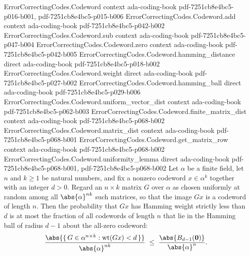 \begin{theorem}
\label{ErrorCorrectingCodes.Codeword.prob_leq_ball_size}
\leanok
{}
\proofstep
  {ErrorCorrectingCodes.Codeword}
  {context}
  {ada-coding-book}
  {pdf-7251cb8e4bc5-p016-b001,
    pdf-7251cb8e4bc5-p015-b006}
\proofstep
  {ErrorCorrectingCodes.Codeword.add}
  {context}
  {ada-coding-book}
  {pdf-7251cb8e4bc5-p042-b002}
\proofstep
  {ErrorCorrectingCodes.Codeword.sub}
  {context}
  {ada-coding-book}
  {pdf-7251cb8e4bc5-p047-b004}
\proofstep
  {ErrorCorrectingCodes.Codeword.zero}
  {context}
  {ada-coding-book}
  {pdf-7251cb8e4bc5-p042-b005}
\proofstep
  {ErrorCorrectingCodes.Codeword.hamming_distance}
  {direct}
  {ada-coding-book}
  {pdf-7251cb8e4bc5-p018-b002}
\proofstep
  {ErrorCorrectingCodes.Codeword.weight}
  {direct}
  {ada-coding-book}
  {pdf-7251cb8e4bc5-p027-b002}
\proofstep
  {ErrorCorrectingCodes.Codeword.hamming_ball}
  {direct}
  {ada-coding-book}
  {pdf-7251cb8e4bc5-p029-b006}
\proofstep
  {ErrorCorrectingCodes.Codeword.uniform_vector_dist}
  {context}
  {ada-coding-book}
  {pdf-7251cb8e4bc5-p062-b003}
\proofstep
  {ErrorCorrectingCodes.Codeword.finite_matrix_dist}
  {context}
  {ada-coding-book}
  {pdf-7251cb8e4bc5-p068-b002}
\proofstep
  {ErrorCorrectingCodes.Codeword.matrix_dist}
  {context}
  {ada-coding-book}
  {pdf-7251cb8e4bc5-p068-b001}
\proofstep
  {ErrorCorrectingCodes.Codeword.get_matrix_row}
  {context}
  {ada-coding-book}
  {pdf-7251cb8e4bc5-p068-b002}
\proofstep
  {ErrorCorrectingCodes.Codeword.uniformity_lemma}
  {direct}
  {ada-coding-book}
  {pdf-7251cb8e4bc5-p068-b001,
    pdf-7251cb8e4bc5-p068-b002}
Let $\alpha$ be a finite field, let $n$ and $k \ge 1$ be natural numbers, and fix a
nonzero codeword $x \in \alpha^{k}$ together with an integer $d > 0$. Regard an $n
\times k$ matrix $G$ over $\alpha$ as chosen uniformly at random among all
$\abs{\alpha}^{nk}$ such matrices, so that the image $Gx$ is a codeword of length $n$.
Then the probability that $Gx$ has Hamming weight strictly less than $d$ is at most the
fraction of all codewords of length $n$ that lie in the Hamming ball of radius $d-1$
about the all-zero codeword:
\[
\frac{\abs{\{\, G \in \alpha^{n \times k} : \operatorname{wt}(Gx) < d
\,\}}}{\abs{\alpha}^{nk}}
\;\le\;
\frac{\abs{B_{d-1}(\mathbf{0})}}{\abs{\alpha}^{n}}.
\]
\end{theorem}

